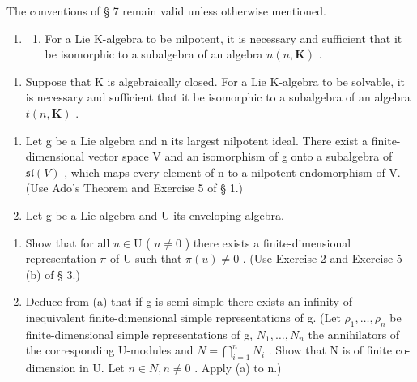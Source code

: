 
The conventions of § 7 remain valid unless otherwise mentioned.

\begin{enumerate}
\def\labelenumi{\arabic{enumi}.}
\tightlist
\item
  \begin{enumerate}
  \def\labelenumii{(\alph{enumii})}
  \tightlist
  \item
    For a Lie K-algebra to be nilpotent, it is necessary and sufficient that it be isomorphic to a subalgebra of an algebra \(n(n, \mathbf{K})\) .
  \end{enumerate}
\end{enumerate}

\begin{enumerate}
\def\labelenumi{(\alph{enumi})}
\setcounter{enumi}{1}
\tightlist
\item
  Suppose that K is algebraically closed. For a Lie K-algebra to be solvable, it is necessary and sufficient that it be isomorphic to a subalgebra of an algebra \(t(n, \mathbf{K})\) .
\end{enumerate}

\begin{enumerate}
\def\labelenumi{\arabic{enumi}.}
\setcounter{enumi}{1}
\item
  Let g be a Lie algebra and n its largest nilpotent ideal. There exist a finite-dimensional vector space V and an isomorphism of g onto a subalgebra of \(\mathfrak{sl}(V)\) , which maps every element of n to a nilpotent endomorphism of V. (Use Ado's Theorem and Exercise 5 of § 1.)
\item
  Let g be a Lie algebra and U its enveloping algebra.
\end{enumerate}

\begin{enumerate}
\def\labelenumi{(\alph{enumi})}
\item
  Show that for all \(u \in \mathrm{U}\) ( \(u \neq 0\) ) there exists a finite-dimensional representation \(\pi\) of \(\mathrm{U}\) such that \(\pi(u) \neq 0\) . (Use Exercise 2 and Exercise 5 (b) of § 3.)
\item
  Deduce from (a) that if g is semi-simple there exists an infinity of inequivalent finite-dimensional simple representations of g. (Let \(\rho_{1},\ldots,\rho_{n}\) be finite-dimensional simple representations of g, \(N_{1},\ldots,N_{n}\) the annihilators of the corresponding U-modules and \(N=\bigcap_{i=1}^{n}N_{i}\) . Show that N is of finite co-dimension in U. Let \(n\in N,n\neq0\) . Apply (a) to n.)
\end{enumerate}

